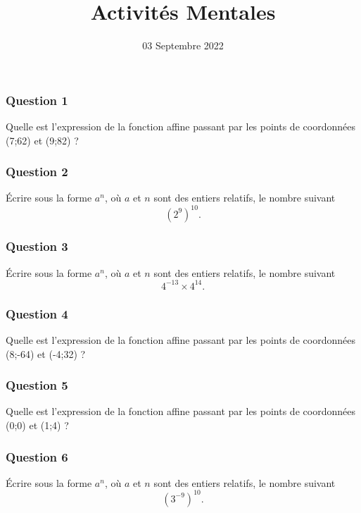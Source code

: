 \documentclass[15pt, mathserif]{beamer}
\title{Activités Mentales}
\date{03 Septembre 2022}
\begin{document}
\begin{frame}
    \titlepage
\end{frame}

\begin{frame} 
	\frametitle{Question 1}
Quelle est l'expression de la fonction affine passant par les points de coordonnées (7;62) et (9;82) ?\end{frame}


\begin{frame} 
	\frametitle{Question 2}
	Écrire sous la forme $a^n$, où $a$ et $n$ sont des entiers relatifs, le nombre suivant \[\left( 2^{9} \right) ^{ 10}. \]\end{frame}


\begin{frame} 
	\frametitle{Question 3}
Écrire sous la forme $a^n$, où $a$ et $n$ sont des entiers relatifs, le nombre suivant \[4^{-13} \times 4^{14}. \]\end{frame}


\begin{frame} 
	\frametitle{Question 4}
Quelle est l'expression de la fonction affine passant par les points de coordonnées (8;-64) et (-4;32) ?\end{frame}


\begin{frame} 
	\frametitle{Question 5}
Quelle est l'expression de la fonction affine passant par les points de coordonnées (0;0) et (1;4) ?\end{frame}


\begin{frame} 
	\frametitle{Question 6}
	Écrire sous la forme $a^n$, où $a$ et $n$ sont des entiers relatifs, le nombre suivant \[\left( 3^{-9} \right) ^{ 10}. \]\end{frame}
\end{document}
